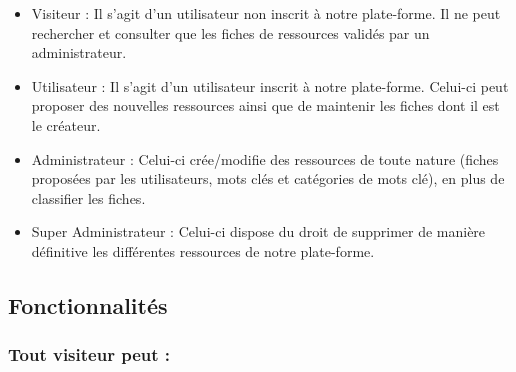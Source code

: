 \begin{itemize}
    \item Visiteur : Il s'agit d'un utilisateur non inscrit à notre plate-forme. Il ne peut rechercher et consulter que les fiches de ressources validés par un administrateur.
    \item Utilisateur : Il s'agit d'un utilisateur  inscrit à notre plate-forme. Celui-ci peut proposer des nouvelles ressources ainsi que de maintenir les fiches dont il est le créateur.
    \item Administrateur : Celui-ci crée/modifie des ressources de toute nature (fiches proposées par les utilisateurs, mots clés et catégories de mots clé), en plus de classifier les fiches.
    \item Super Administrateur : Celui-ci dispose du droit de supprimer de manière définitive les différentes ressources de notre plate-forme.
\end{itemize}

\subsection*{Fonctionnalités}

\subsubsection*{Tout visiteur peut : }

